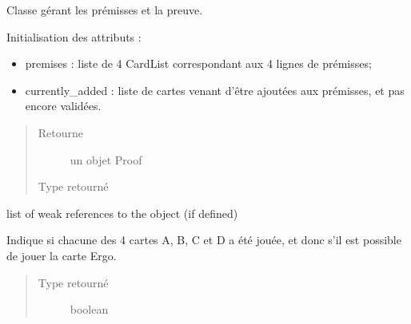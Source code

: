 \documentclass[letterpaper,10pt,french]{sphinxmanual}
\begin{document}
\begin{fulllineitems}
\label{\detokenize{doc_classe:cards.Proof}}
Classe gérant les prémisses et la preuve.

\begin{fulllineitems}
\label{\detokenize{doc_classe:cards.Proof.__init__}}
Initialisation des attributs :
\begin{itemize}
\item {} 
premises : liste de 4 CardList correspondant aux 4 lignes de
prémisses;

\item {} 
currently\_added : liste de cartes venant d’être ajoutées aux
prémisses, et pas encore validées.

\end{itemize}
\begin{quote}\begin{description}
\item[{Retourne}] \leavevmode
un objet Proof

\item[{Type retourné}] \leavevmode
{\hyperref[\detokenize{doc_classe:cards.Proof}]{}}

\end{description}\end{quote}

\end{fulllineitems}


\begin{fulllineitems}
\label{\detokenize{doc_classe:cards.Proof.__weakref__}}
list of weak references to the object (if defined)

\end{fulllineitems}


\begin{fulllineitems}
\label{\detokenize{doc_classe:cards.Proof.all_cards_played}}
Indique si chacune des 4 cartes A, B, C et D a été jouée, et donc
s’il est possible de jouer la carte Ergo.
\begin{quote}\begin{description}
\item[{Type retourné}] \leavevmode
boolean


\end{description}
\end{quote}
\end{fulllineitems}
\end{fulllineitems}
\end{document}
